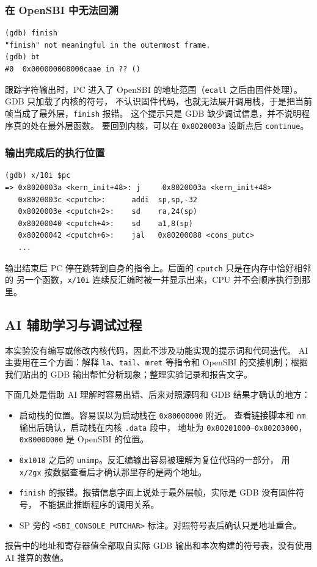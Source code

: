 \documentclass[UTF8,a4paper,10pt,fontset=none]{ctexart}
\begin{document}
\subsubsection{在 OpenSBI 中无法回溯}
\begin{verbatim}
(gdb) finish
"finish" not meaningful in the outermost frame.
(gdb) bt
#0  0x000000008000caae in ?? ()
\end{verbatim}
跟踪字符输出时，PC 进入了 OpenSBI 的地址范围（\texttt{ecall} 之后由固件处理）。GDB 只加载了内核的符号，
不认识固件代码，也就无法展开调用栈，于是把当前帧当成了最外层，\texttt{finish} 报错。
这个提示只是 GDB 缺少调试信息，并不说明程序真的处在最外层函数。
要回到内核，可以在 \texttt{0x8020003a} 设断点后 \texttt{continue}。

\subsubsection{输出完成后的执行位置}
\begin{verbatim}
(gdb) x/10i $pc
=> 0x8020003a <kern_init+48>: j     0x8020003a <kern_init+48>
   0x8020003c <cputch>:      addi  sp,sp,-32
   0x8020003e <cputch+2>:    sd    ra,24(sp)
   0x80200040 <cputch+4>:    sd    a1,8(sp)
   0x80200042 <cputch+6>:    jal   0x80200088 <cons_putc>
   ...
\end{verbatim}
输出结束后 PC 停在跳转到自身的指令上。后面的 \texttt{cputch} 只是在内存中恰好相邻的
另一个函数，\texttt{x/10i} 连续反汇编时被一并显示出来，CPU 并不会顺序执行到那里。

\subsection{AI 辅助学习与调试过程}
本实验没有编写或修改内核代码，因此不涉及功能实现的提示词和代码迭代。
AI 主要用在三个方面：解释 \texttt{la}、\texttt{tail}、\texttt{mret} 等指令和
OpenSBI 的交接机制；根据我们贴出的 GDB 输出帮忙分析现象；整理实验记录和报告文字。

下面几处是借助 AI 理解时容易出错、后来对照源码和 GDB 结果才确认的地方：
\begin{itemize}
    \item 启动栈的位置。容易误以为启动栈在 \texttt{0x80000000} 附近。
          查看链接脚本和 \texttt{nm} 输出后确认，启动栈在内核 \texttt{.data} 段中，
          地址为 \texttt{0x80201000}--\texttt{0x80203000}，\texttt{0x80000000} 是 OpenSBI 的位置。
    \item \texttt{0x1018} 之后的 \texttt{unimp}。反汇编输出容易被理解为复位代码的一部分，
          用 \texttt{x/2gx} 按数据查看后才确认那里存的是两个地址。
    \item \texttt{finish} 的报错。报错信息字面上说处于最外层帧，实际是 GDB 没有固件符号，
          不能据此推断程序的调用关系。
    \item SP 旁的 \texttt{<SBI\_CONSOLE\_PUTCHAR>} 标注。对照符号表后确认只是地址重合。
\end{itemize}
报告中的地址和寄存器值全部取自实际 GDB 输出和本次构建的符号表，没有使用 AI 推算的数值。
\end{document}

